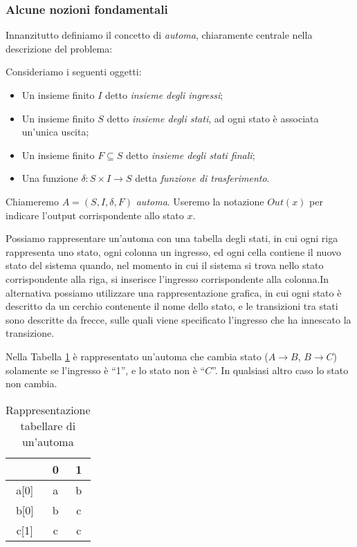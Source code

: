 \subsubsection{Alcune nozioni fondamentali}
Innanzitutto definiamo il concetto di \emph{automa}, chiaramente centrale nella descrizione del problema:
\begin{definition}
    Consideriamo i seguenti oggetti:
    \begin{itemize}
        \item Un insieme finito $I$ detto \emph{insieme degli ingressi};
        \item Un insieme finito $S$ detto \emph{insieme degli stati}, ad ogni stato è associata un'unica uscita;
        \item Un insieme finito $F \subseteq S$ detto \emph{insieme degli stati finali};
        \item Una funzione $\delta: S \times I \to S$ detta \emph{funzione di trasferimento}.
    \end{itemize}
    Chiameremo $A = (S,I,\delta,F)$ \emph{automa}. Useremo la notazione $Out(x)$ per indicare l'output corrispondente allo stato $x$.
\end{definition}
Possiamo rappresentare un'automa con una tabella degli stati, in cui ogni riga rappresenta uno stato, ogni colonna un ingresso, ed ogni cella contiene il nuovo stato del sistema quando, nel momento in cui il sistema si trova nello stato corrispondente alla riga, si inserisce l'ingresso corrispondente alla colonna.In alternativa possiamo utilizzare una rappresentazione grafica, in cui ogni stato è descritto da un cerchio contenente il nome dello stato, e le transizioni tra stati sono descritte da frecce, sulle quali viene specificato l'ingresso che ha innescato la transizione.\\
\begin{example}
    Nella Tabella \ref*{fig:tab_automata} è rappresentato un'automa che cambia stato ($A \to B$, $B \to C$) solamente se l'ingresso è ``1'', e lo stato non è ``$C$''. In qualsiasi altro caso lo stato non cambia.
    \begin{table}[ht]
        \centering
        \begin{tabular}{ c | c c }
            \hline
            & 0 & 1\\
            \hline
            a[0] & a & b \\
            b[0] & b & c \\
            c[1] & c & c \\
            \hline
          \end{tabular}
        \caption{Rappresentazione tabellare di un'automa}
        \label{fig:tab_automata}
    \end{table}
    \label{exa:automata_tab}
\end{example}
